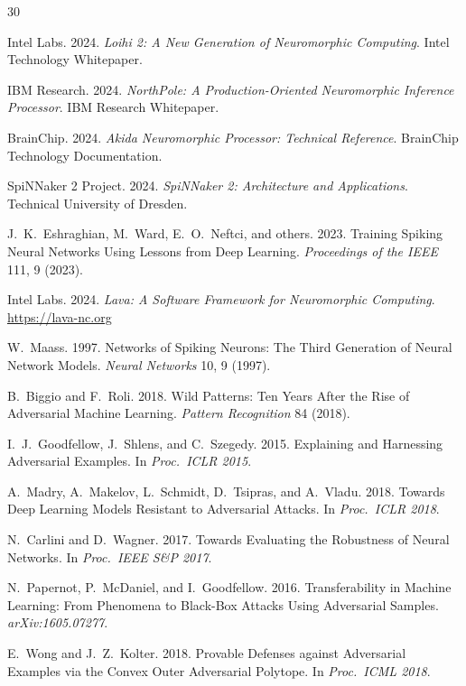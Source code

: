 \documentclass[sigconf,nonacm]{acmart}
\begin{document}
\sloppy

\begin{thebibliography}{30}

Intel Labs. 2024. \textit{Loihi 2: A New Generation of
Neuromorphic Computing}. Intel Technology Whitepaper.

IBM Research. 2024. \textit{NorthPole: A Production-Oriented
Neuromorphic Inference Processor}. IBM Research Whitepaper.

BrainChip. 2024. \textit{Akida Neuromorphic Processor: Technical
Reference}. BrainChip Technology Documentation.

SpiNNaker 2 Project. 2024. \textit{SpiNNaker 2: Architecture and
Applications}. Technical University of Dresden.

J.~K.~Eshraghian, M.~Ward, E.~O.~Neftci, and others. 2023.
Training Spiking Neural Networks Using Lessons from Deep
Learning. \textit{Proceedings of the IEEE} 111, 9 (2023).

Intel Labs. 2024. \textit{Lava: A Software Framework for
Neuromorphic Computing}. \url{https://lava-nc.org}

W.~Maass. 1997. Networks of Spiking Neurons: The Third Generation
of Neural Network Models. \textit{Neural Networks} 10, 9 (1997).

B.~Biggio and F.~Roli. 2018. Wild Patterns: Ten Years After the
Rise of Adversarial Machine Learning. \textit{Pattern Recognition}
84 (2018).

I.~J.~Goodfellow, J.~Shlens, and C.~Szegedy. 2015. Explaining and
Harnessing Adversarial Examples. In \textit{Proc.\ ICLR 2015}.

A.~Madry, A.~Makelov, L.~Schmidt, D.~Tsipras, and A.~Vladu. 2018.
Towards Deep Learning Models Resistant to Adversarial Attacks.
In \textit{Proc.\ ICLR 2018}.

N.~Carlini and D.~Wagner. 2017. Towards Evaluating the Robustness
of Neural Networks. In \textit{Proc.\ IEEE S\&P 2017}.

N.~Papernot, P.~McDaniel, and I.~Goodfellow. 2016. Transferability
in Machine Learning: From Phenomena to Black-Box Attacks Using
Adversarial Samples. \textit{arXiv:1605.07277}.

E.~Wong and J.~Z.~Kolter. 2018. Provable Defenses against
Adversarial Examples via the Convex Outer Adversarial Polytope.
In \textit{Proc.\ ICML 2018}.


\end{thebibliography}
\end{document}
